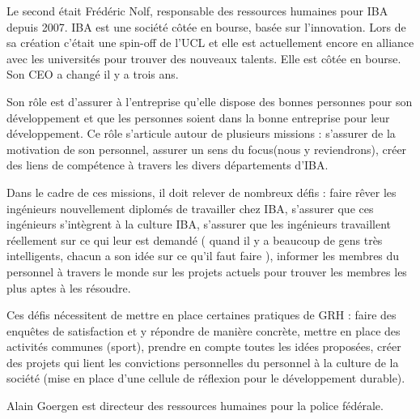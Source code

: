 \documentclass[a4paper, 12pt]{article}
\begin{document}
Le second était Frédéric Nolf, responsable des ressources humaines pour IBA depuis 2007. IBA est une société côtée en bourse, basée sur l'innovation. Lors de sa création c'était une spin-off de l'UCL et elle est actuellement encore en alliance avec les universités pour trouver des nouveaux talents. Elle est côtée en bourse. Son CEO a changé il y a trois ans.

Son rôle est d'assurer à l'entreprise qu'elle dispose des bonnes personnes pour son développement et que les personnes soient dans la bonne entreprise pour leur développement. Ce rôle s'articule autour de plusieurs missions : s'assurer de la motivation de son personnel, assurer un \og{} sens du focus\fg{}(nous y reviendrons), créer des liens de compétence à travers les divers départements d'IBA.


Dans le cadre de ces missions, il doit relever de nombreux défis : faire rêver les ingénieurs nouvellement diplomés de travailler chez IBA, s'assurer que ces ingénieurs s'intègrent à la culture IBA, s'assurer que les ingénieurs travaillent réellement sur ce qui leur est demandé (\og{} quand il y a beaucoup de gens très intelligents, chacun a son idée sur ce qu'il faut faire \fg{}), informer les membres du personnel à travers le monde sur les projets actuels pour trouver les membres les plus aptes à les résoudre.

Ces défis nécessitent de mettre en place certaines pratiques de GRH : faire des enquêtes de satisfaction et y répondre de manière concrète, mettre en place des activités communes (sport), prendre en compte toutes les idées proposées, créer des projets qui lient les convictions personnelles du personnel à la culture de la société (mise en place d'une cellule de réflexion pour le développement durable).

Alain Goergen est directeur des ressources humaines pour la police fédérale.











\end{document}
